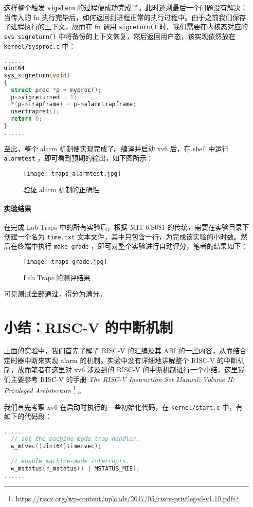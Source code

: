 这样整个触发 \lstinline{sigalarm} 的过程便成功完成了。此时还剩最后一个问题没有解决：当传入的 fn 执行完毕后，如何返回到进程正常的执行过程中。由于之前我们保存了进程执行的上下文，故而在 fn 调用 \lstinline{sigreturn()} 时，我们需要在内核态对应的 \lstinline{sys_sigreturn()} 中将备份的上下文恢复，然后返回用户态，该实现依然放在 \lstinline{kernel/sysproc.c} 中：
\begin{lstlisting}[language=C]
......
uint64
sys_sigreturn(void)
{
  struct proc *p = myproc();
  p->sigreturned = 1;
  *(p->trapframe) = p->alarmtrapframe;
  usertrapret();
  return 0;
}
......
\end{lstlisting}

至此，整个 alarm 机制便实现完成了。编译并启动 xv6 后，在 shell 中运行 \lstinline{alarmtest} ，即可看到预期的输出，如下图所示：
\begin{figure}[H]
  \centering
  \texttt{[image: traps\_alarmtest.jpg]}
  \caption{ 验证 alarm 机制的正确性 }
\end{figure}

\paragraph*{实验结果} 在完成 Lab Traps 中的所有实验后，根据 MIT 6.S081 的传统，需要在实验目录下创建一个名为 \lstinline{time.txt} 文本文件，其中只包含一行，为完成该实验的小时数。然后在终端中执行 \lstinline{make grade} ，即可对整个实验进行自动评分，笔者的结果如下：
\begin{figure}[H]
  \centering
  \texttt{[image: traps\_grade.jpg]}
  \caption{ Lab Traps 的测评结果}
\end{figure}
可见测试全部通过，得分为满分。

\section{小结：RISC-V 的中断机制}

上面的实验中，我们首先了解了 RISC-V 的汇编及其 ABI 的一些内容，从而结合定时器中断来实现 alarm 的机制。实验中没有详细地讲解整个 RISC-V 的中断机制，故而笔者在这里对 xv6 涉及到的 RISC-V 的中断机制进行一个小结，这里我们主要参考 RISC-V 的手册 \textit{The RISC-V Instruction Set Manual: Volume II: Privileged Architecture} \footnote{\url{https://riscv.org/wp-content/uploads/2017/05/riscv-privileged-v1.10.pdf}} 。

我们首先考察 xv6 在启动时执行的一些初始化代码，在 \lstinline{kernel/start.c} 中，有如下的代码段：
\begin{lstlisting}[language=C]
......
  // set the machine-mode trap handler.
  w_mtvec((uint64)timervec);

  // enable machine-mode interrupts.
  w_mstatus(r_mstatus() | MSTATUS_MIE);
......
\end{lstlisting}

